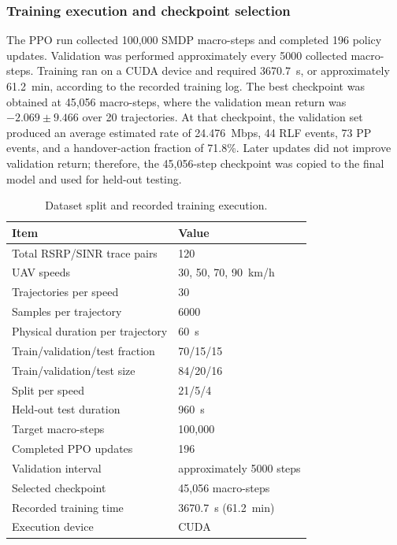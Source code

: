 \subsubsection{Training execution and checkpoint selection}

The PPO run collected 100,000 SMDP macro-steps and completed 196 policy
updates. Validation was performed approximately every 5000 collected
macro-steps. Training ran on a CUDA device and required 3670.7~s, or
approximately 61.2~min, according to the recorded training log. The best
checkpoint was obtained at 45,056 macro-steps, where the validation mean
return was $-2.069\pm9.466$ over 20 trajectories. At that checkpoint, the
validation set produced an average estimated rate of 24.476~Mbps, 44 RLF
events, 73 PP events, and a handover-action fraction of 71.8\%. Later updates
did not improve validation return; therefore, the 45,056-step checkpoint was
copied to the final model and used for held-out testing.

\begin{table}[t]
\centering
\caption{Dataset split and recorded training execution.}
\label{tab:dataset-training-setup}
\begin{tabular}{@{}ll@{}}
\toprule
Item & Value \\
\midrule
Total RSRP/SINR trace pairs & 120 \\
UAV speeds & 30, 50, 70, 90~km/h \\
Trajectories per speed & 30 \\
Samples per trajectory & 6000 \\
Physical duration per trajectory & 60~s \\
Train/validation/test fraction & 70/15/15 \\
Train/validation/test size & 84/20/16 \\
Split per speed & 21/5/4 \\
Held-out test duration & 960~s \\
Target macro-steps & 100,000 \\
Completed PPO updates & 196 \\
Validation interval & approximately 5000 steps \\
Selected checkpoint & 45,056 macro-steps \\
Recorded training time & 3670.7~s (61.2~min) \\
Execution device & CUDA \\
\bottomrule
\end{tabular}
\end{table}

